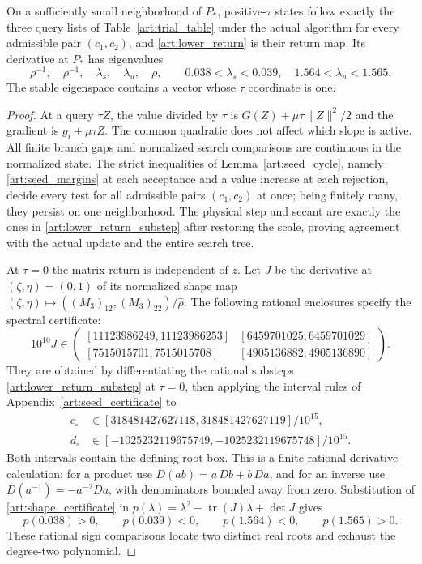 \begin{lemma}\label{art:lower_hyperbolic}
On a sufficiently small neighborhood of $P_*$, positive-$\tau$ states
follow exactly the three query lists of Table~\ref{art:trial_table} under
the actual algorithm for every admissible pair $(c_1,c_2)$, and
\eqref{art:lower_return} is their return map.
Its derivative at $P_*$ has eigenvalues
\[
 \rho^{-1},\quad\rho^{-1},\quad\lambda_s,\quad\lambda_u,\quad\rho,
 \qquad 0.038<\lambda_s<0.039,\quad1.564<\lambda_u<1.565.
\]
The stable eigenspace contains a vector whose $\tau$ coordinate is one.
\end{lemma}
\begin{proof}
At a query $\tau Z$, the value divided by $\tau$ is
$G(Z)+\mu\tau\|Z\|^2/2$ and the gradient is $g_i+\mu\tau Z$.
The common quadratic does not affect which slope is active. All finite
branch gaps and normalized search comparisons are continuous in the
normalized state. The strict inequalities of Lemma~\ref{art:seed_cycle},
namely \eqref{art:seed_margins} at each acceptance and a value increase at each
rejection, decide every test for all admissible pairs $(c_1,c_2)$ at once;
being finitely many, they persist on one neighborhood. The physical step and secant are exactly the ones in
\eqref{art:lower_return_substep} after restoring the scale, proving
agreement with the actual update and the entire search tree.

At $\tau=0$ the matrix return is independent of $z$. Let $J$ be the
derivative at $(\zeta,\eta)=(0,1)$ of its normalized shape map
$(\zeta,\eta)\mapsto((M_3)_{12},(M_3)_{22})/\hat\rho$.
The following rational enclosures specify the spectral certificate:
\begin{equation}\label{art:shape_certificate}
 10^{10}J\in
 \begin{pmatrix}
 [11123986249,11123986253]&[6459701025,6459701029]\\
 [7515015701,7515015708]&[4905136882,4905136890]
 \end{pmatrix}.
\end{equation}
They are obtained by differentiating the rational substeps
\eqref{art:lower_return_substep} at $\tau=0$, then applying the interval
rules of Appendix~\ref{art:seed_certificate} to
\begin{align*}
 c_\circ&\in[318481427627118,318481427627119]/10^{15},\\
 d_\circ&\in[-1025232119675749,-1025232119675748]/10^{15}.
\end{align*}
Both intervals contain the defining root box. This is a finite rational
derivative calculation: for a product use
$D(ab)=a\,Db+b\,Da$, and for an inverse use
$D(a^{-1})=-a^{-2}Da$, with denominators bounded away from zero.
Substitution of \eqref{art:shape_certificate} in
$p(\lambda)=\lambda^2-\operatorname{tr}(J)\lambda+\det J$ gives
\[
 p(0.038)>0,\qquad p(0.039)<0,\qquad
 p(1.564)<0,\qquad p(1.565)>0.
\]
These rational sign comparisons locate two distinct real roots and exhaust
the degree-two polynomial.


\end{proof}
